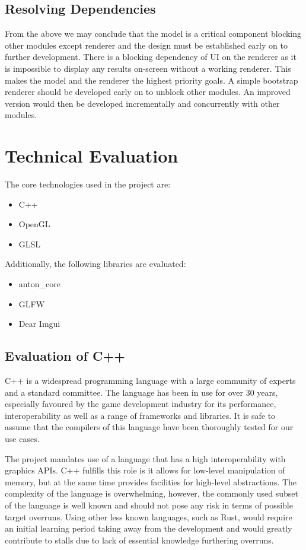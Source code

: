 \documentclass[12pt, a4paper]{article}
\newenvironment{itemlist}
{\begin{itemize}
  \setlength{\itemsep}{0pt}}
{\end{itemize}}
\begin{document}
\subsection{Resolving Dependencies}
From the above we may conclude that the model is a critical component blocking other modules except
renderer and the design must be established early on to further development. There is a blocking
dependency of UI on the renderer as it is impossible to display any results on-screen without a
working renderer. This makes the model and the renderer the highest priority goals. A simple
bootstrap renderer should be developed early on to unblock other modules. An improved version would
then be developed incrementally and concurrently with other modules.

\section{Technical Evaluation}
The core technologies used in the project are:
\begin{itemlist}
\item C++
\item OpenGL
\item GLSL
\end{itemlist}

Additionally, the following libraries are evaluated:
\begin{itemlist}
\item anton{\_}core
\item GLFW
\item Dear Imgui
\end{itemlist}

\subsection{Evaluation of C++}
C++ is a widespread programming language with a large community of experts and a standard committee.
The language has been in use for over 30 years, especially favoured by the game development industry
for its performance, interoperability as well as a range of frameworks and libraries. It is safe to
assume that the compilers of this language have been thoroughly tested for our use cases.

The project mandates use of a language that has a high interoperability with graphics APIs. C++
fulfills this role is it allows for low-level manipulation of memory, but at the same time provides
facilities for high-level abstractions. The complexity of the language is overwhelming, however, the
commonly used subset of the language is well known and should not pose any risk in terms of possible
target overruns. Using other less known languages, such as Rust, would require an initial learning
period taking away from the development and would greatly contribute to stalls due to lack of
essential knowledge furthering overruns.
\end{document}
